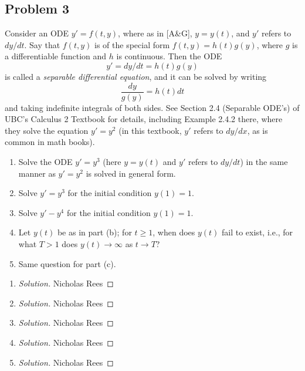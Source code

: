 \documentclass{article}
\begin{document}
\subsection*{Problem 3}
Consider an ODE $y' = f(t,y)$, where as in [A\&G], $y = y(t)$,
and $y'$ refers to $dy/dt$.
Say that $f(t,y)$ is of the special form $f(t,y) = h(t)g(y)$,
where $g$ is a differentiable function and $h$ is continuous.
Then the ODE
\[
	y' = dy/dt = h(t)g(y)
\]
is called a \emph{separable differential equation}, and it can be solved by writing
\[
	\frac{dy}{g(y)} = h(t)dt
\]
and taking indefinite integrals of both sides.
See Section 2.4 (Separable ODE's) of UBC's Calculus 2 Textbook for details,
including Example 2.4.2 there, where they solve the equation $y' = y^2$
(in this textbook, $y'$ refers to $dy/dx$, as is common in math books).
\begin{enumerate}
	\item Solve the ODE $y' = y^3$
		(here $y = y(t)$ and $y'$ refers to $dy/dt$) in the same manner
		as $y' = y^2$ is solved in general form.
	\item Solve $y' = y^3$ for the initial condition $y(1) = 1$.
	\item Solve $y' - y^4$ for the initial condition $y(1) = 1$.
	\item Let $y(t)$ be as in part (b); for $t \geq 1$,
		when does $y(t)$ fail to exist, i.e.,
		for what $T > 1$ does $y(t) \to \infty$ as $t \to T$?
	\item Same question for part (c).
\end{enumerate}
\begin{enumerate}
	\item \begin{proof}[Solution]\let\qed\relax
		Nicholas Rees
	\end{proof}
	\item \begin{proof}[Solution]\let\qed\relax
		Nicholas Rees
	\end{proof}
	\item \begin{proof}[Solution]\let\qed\relax
		Nicholas Rees
	\end{proof}
	\item \begin{proof}[Solution]\let\qed\relax
		Nicholas Rees
	\end{proof}
	\item \begin{proof}[Solution]\let\qed\relax
		Nicholas Rees
	\end{proof}
\end{enumerate}
\end{document}
